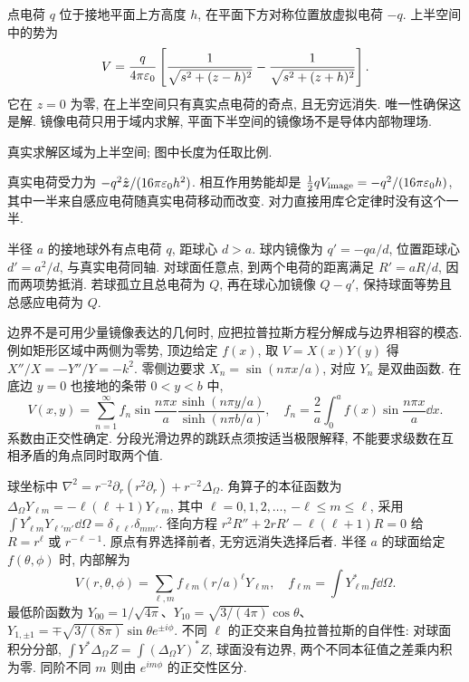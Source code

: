 点电荷 $q$ 位于接地平面上方高度 $h$, 在平面下方对称位置放虚拟电荷 $-q$. 上半空间中的势为
\[
V=\frac q{4\pi\varepsilon_0}\left[\frac1{\sqrt{s^2+(z-h)^2}}-\frac1{\sqrt{s^2+(z+h)^2}}\right].
\]
它在 $z=0$ 为零, 在上半空间只有真实点电荷的奇点, 且无穷远消失. 唯一性确保这是解. 镜像电荷只用于域内求解, 平面下半空间的镜像场不是导体内部物理场.
\begin{center}
\par
真实求解区域为上半空间; 图中长度为任取比例.
\end{center}
真实电荷受力为 $-q^2\hat{\boldsymbol{z}}/(16\pi\varepsilon_0 h^2)$. 相互作用势能却是 $\frac12qV_\mathrm{image}=-q^2/(16\pi\varepsilon_0 h)$, 其中一半来自感应电荷随真实电荷移动而改变. 对力直接用库仑定律时没有这个一半.

半径 $a$ 的接地球外有点电荷 $q$, 距球心 $d>a$. 球内镜像为 $q'=-qa/d$, 位置距球心 $d'=a^2/d$, 与真实电荷同轴. 对球面任意点, 到两个电荷的距离满足 $R'=aR/d$, 因而两项势抵消. 若球孤立且总电荷为 $Q$, 再在球心加镜像 $Q-q'$, 保持球面等势且总感应电荷为 $Q$.

边界不是可用少量镜像表达的几何时, 应把拉普拉斯方程分解成与边界相容的模态. 例如矩形区域中两侧为零势, 顶边给定 $f(x)$, 取 $V=X(x)Y(y)$ 得 $X''/X=-Y''/Y=-k^2$. 零侧边要求 $X_n=\sin(n\pi x/a)$, 对应 $Y_n$ 是双曲函数. 在底边 $y=0$ 也接地的条带 $0<y<b$ 中,
\[
V(x,y)=\sum_{n=1}^\infty f_n\sin\frac{n\pi x}{a}\frac{\sinh(n\pi y/a)}{\sinh(n\pi b/a)},\quad
f_n=\frac2a\int_0^af(x)\sin\frac{n\pi x}{a}\dd x.
\]
系数由正交性确定. 分段光滑边界的跳跃点须按适当极限解释, 不能要求级数在互相矛盾的角点同时取两个值.

球坐标中 $\nabla^2=r^{-2}\partial_r(r^2\partial_r)+r^{-2}\Delta_\Omega$. 角算子的本征函数为 $\Delta_\Omega Y_{\ell m}=-\ell(\ell+1)Y_{\ell m}$, 其中 $\ell=0,1,2,\ldots$, $-\ell\le m\le\ell$, 采用 $\int Y_{\ell m}^*Y_{\ell'm'}\dd\Omega=\delta_{\ell\ell'}\delta_{mm'}$. 径向方程 $r^2R''+2rR'-\ell(\ell+1)R=0$ 给 $R=r^\ell$ 或 $r^{-\ell-1}$. 原点有界选择前者, 无穷远消失选择后者. 半径 $a$ 的球面给定 $f(\theta,\phi)$ 时, 内部解为
\[
V(r,\theta,\phi)=\sum_{\ell,m}f_{\ell m}(r/a)^\ell Y_{\ell m},\quad
f_{\ell m}=\int Y_{\ell m}^*f\dd\Omega.
\]
最低阶函数为 $Y_{00}=1/\sqrt{4\pi}$、$Y_{10}=\sqrt{3/(4\pi)}\cos\theta$、$Y_{1,\pm1}=\mp\sqrt{3/(8\pi)}\sin\theta e^{\pm i\phi}$. 不同 $\ell$ 的正交来自角拉普拉斯的自伴性: 对球面积分分部, $\int Y^*\Delta_\Omega Z=\int(\Delta_\Omega Y)^*Z$, 球面没有边界, 两个不同本征值之差乘内积为零. 同阶不同 $m$ 则由 $e^{im\phi}$ 的正交性区分.

